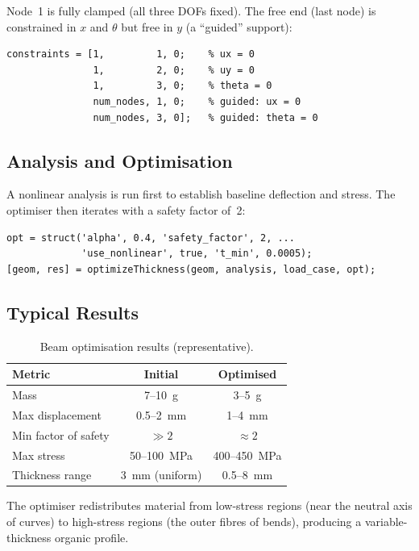 Node~1 is fully clamped (all three DOFs fixed).  The free end (last node) is
constrained in $x$ and $\theta$ but free in $y$ (a ``guided'' support):

\begin{lstlisting}[caption={Boundary conditions.}]
constraints = [1,         1, 0;    % ux = 0
               1,         2, 0;    % uy = 0
               1,         3, 0;    % theta = 0
               num_nodes, 1, 0;    % guided: ux = 0
               num_nodes, 3, 0];   % guided: theta = 0
\end{lstlisting}

\subsection{Analysis and Optimisation}

A nonlinear analysis is run first to establish baseline deflection and
stress.  The optimiser then iterates with a safety factor of~2:

\begin{lstlisting}[caption={Optimisation call.}]
opt = struct('alpha', 0.4, 'safety_factor', 2, ...
             'use_nonlinear', true, 't_min', 0.0005);
[geom, res] = optimizeThickness(geom, analysis, load_case, opt);
\end{lstlisting}

\subsection{Typical Results}

\begin{table}[H]
\centering
\caption{Beam optimisation results (representative).}
\begin{tabular}{lcc}
\toprule
\textbf{Metric} & \textbf{Initial} & \textbf{Optimised} \\
\midrule
Mass                    & 7--10~g    & 3--5~g \\
Max displacement        & 0.5--2~mm  & 1--4~mm \\
Min factor of safety    & $\gg 2$    & $\approx 2$ \\
Max stress              & 50--100~MPa & 400--450~MPa \\
Thickness range         & 3~mm (uniform) & 0.5--8~mm \\
\bottomrule
\end{tabular}
\end{table}

The optimiser redistributes material from low-stress regions (near the
neutral axis of curves) to high-stress regions (the outer fibres of bends),
producing a variable-thickness organic profile.

